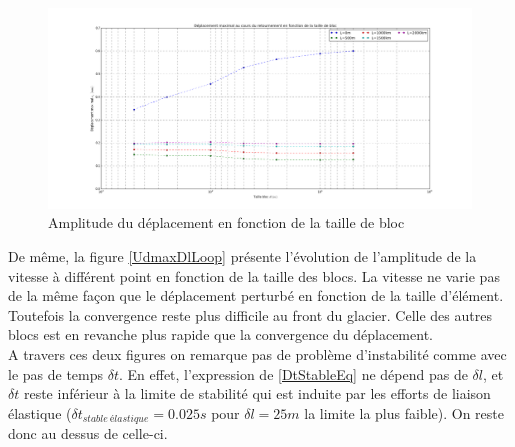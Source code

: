\documentclass[11pt, a4paper]{article}
\begin{document}
\begin{figure}[h!]
	\centering
	\includegraphics[width=1\linewidth]{figures/Part4/Displacement.png}
	\caption{Amplitude du déplacement en fonction de la taille de bloc}
    \label{UmaxDlLoop}
\end{figure}
De même, la figure \ref{UdmaxDlLoop} présente l'évolution de l'amplitude de la vitesse à différent point en fonction de la taille des blocs. La vitesse ne varie pas de la même façon que le déplacement perturbé en fonction de la taille d'élément. Toutefois la convergence reste plus difficile au front du glacier. Celle des autres blocs est en revanche plus rapide que la convergence du déplacement.
\\ A travers ces deux figures on remarque pas de problème d'instabilité comme avec le pas de temps $\delta t$. En effet, l'expression de \ref{DtStableEq} ne dépend pas de $\delta l$, et $\delta t$ reste inférieur à la limite de stabilité qui est induite par les efforts de liaison élastique ($\delta t_{stable \ élastique} = 0.025s$ pour $\delta l= 25m$ la limite la plus faible). On reste donc au dessus de celle-ci.
\\
\end{document}
